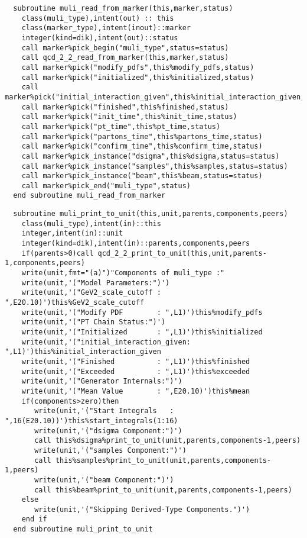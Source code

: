 \begin{Verbatim}
  subroutine muli_read_from_marker(this,marker,status)
    class(muli_type),intent(out) :: this
    class(marker_type),intent(inout)::marker
    integer(kind=dik),intent(out)::status
    call marker%pick_begin("muli_type",status=status)
    call qcd_2_2_read_from_marker(this,marker,status)
    call marker%pick("modify_pdfs",this%modify_pdfs,status)
    call marker%pick("initialized",this%initialized,status)
    call marker%pick("initial_interaction_given",this%initial_interaction_given,status)
    call marker%pick("finished",this%finished,status)
    call marker%pick("init_time",this%init_time,status)
    call marker%pick("pt_time",this%pt_time,status)
    call marker%pick("partons_time",this%partons_time,status)
    call marker%pick("confirm_time",this%confirm_time,status)
    call marker%pick_instance("dsigma",this%dsigma,status=status)
    call marker%pick_instance("samples",this%samples,status=status)
    call marker%pick_instance("beam",this%beam,status=status)
    call marker%pick_end("muli_type",status)
  end subroutine muli_read_from_marker
\end{Verbatim}

\begin{Verbatim}
  subroutine muli_print_to_unit(this,unit,parents,components,peers)
    class(muli_type),intent(in)::this
    integer,intent(in)::unit
    integer(kind=dik),intent(in)::parents,components,peers
    if(parents>0)call qcd_2_2_print_to_unit(this,unit,parents-1,components,peers)
    write(unit,fmt="(a)")"Components of muli_type :"
    write(unit,'("Model Parameters:")')
    write(unit,'("GeV2_scale_cutoff : ",E20.10)')this%GeV2_scale_cutoff
    write(unit,'("Modify PDF        : ",L1)')this%modify_pdfs
    write(unit,'("PT Chain Status:")')
    write(unit,'("Initialized       : ",L1)')this%initialized
    write(unit,'("initial_interaction_given: ",L1)')this%initial_interaction_given
    write(unit,'("Finished          : ",L1)')this%finished
    write(unit,'("Exceeded          : ",L1)')this%exceeded
    write(unit,'("Generator Internals:")')
    write(unit,'("Mean Value        : ",E20.10)')this%mean
    if(components>zero)then
       write(unit,'("Start Integrals   : ",16(E20.10))')this%start_integrals(1:16)
       write(unit,'("dsigma Component:")')
       call this%dsigma%print_to_unit(unit,parents,components-1,peers)
       write(unit,'("samples Component:")')
       call this%samples%print_to_unit(unit,parents,components-1,peers)
       write(unit,'("beam Component:")')
       call this%beam%print_to_unit(unit,parents,components-1,peers)
    else
       write(unit,'("Skipping Derived-Type Components.")')
    end if
  end subroutine muli_print_to_unit
\end{Verbatim}

